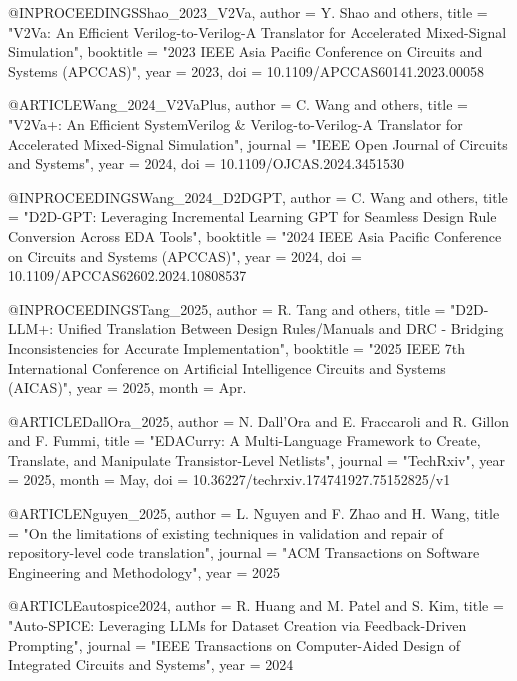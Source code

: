 \documentclass[conference]{IEEEtran}
\begin{document}
\begin{thebibliography}
@INPROCEEDINGS{Shao_2023_V2Va,
    author      =   {Y. {Shao} and others},
    title       =   "{V2Va: An Efficient Verilog-to-Verilog-A Translator for Accelerated Mixed-Signal Simulation}",
    booktitle   =   "{2023 IEEE Asia Pacific Conference on Circuits and Systems (APCCAS)}",
    year        =   {2023},
    doi         =   {10.1109/APCCAS60141.2023.00058}
}

@ARTICLE{Wang_2024_V2VaPlus,
    author      =   {C. {Wang} and others},
    title       =   "{V2Va+: An Efficient SystemVerilog \& Verilog-to-Verilog-A Translator for Accelerated Mixed-Signal Simulation}",
    journal     =   "{IEEE Open Journal of Circuits and Systems}",
    year        =   {2024},
    doi         =   {10.1109/OJCAS.2024.3451530}
}

@INPROCEEDINGS{Wang_2024_D2DGPT,
    author      =   {C. {Wang} and others},
    title       =   "{D2D-GPT: Leveraging Incremental Learning {GPT} for Seamless Design Rule Conversion Across {EDA} Tools}",
    booktitle   =   "{2024 IEEE Asia Pacific Conference on Circuits and Systems (APCCAS)}",
    year        =   {2024},
    doi         =   {10.1109/APCCAS62602.2024.10808537}
}

@INPROCEEDINGS{Tang_2025,
    author      =   {R. {Tang} and others},
    title       =   "{D2D-LLM+: Unified Translation Between Design Rules/Manuals and {DRC} - Bridging Inconsistencies for Accurate Implementation}",
    booktitle   =   "{2025 IEEE 7th International Conference on Artificial Intelligence Circuits and Systems (AICAS)}",
    year        =   {2025},
    month       =   {Apr.}
}

@ARTICLE{DallOra_2025,
    author      =   {N. {Dall’Ora} and E. {Fraccaroli} and R. {Gillon} and F. {Fummi}},
    title       =   "{EDACurry: A Multi-Language Framework to Create, Translate, and Manipulate Transistor-Level Netlists}",
    journal     =   "{TechRxiv}",
    year        =   {2025},
    month       =   {May},
    doi         =   {10.36227/techrxiv.174741927.75152825/v1}
}

@ARTICLE{Nguyen_2025,
    author      =   {L. {Nguyen} and F. {Zhao} and H. {Wang}},
    title       =   "{On the limitations of existing techniques in validation and repair of repository-level code translation}",
    journal     =   "{ACM Transactions on Software Engineering and Methodology}",
    year        =   {2025}
}

@ARTICLE{autospice2024,
    author      =   {R. {Huang} and M. {Patel} and S. {Kim}},
    title       =   "{Auto-{SPICE}: Leveraging {LLMs} for Dataset Creation via Feedback-Driven Prompting}",
    journal     =   "{IEEE Transactions on Computer-Aided Design of Integrated Circuits and Systems}",
    year        =   {2024}
}


\end{thebibliography}
\end{document}
